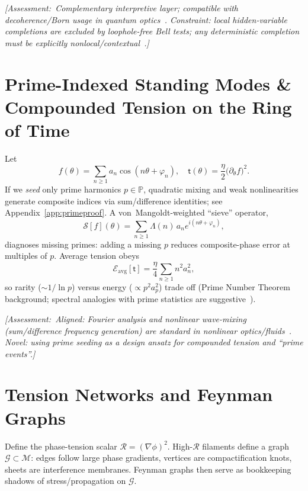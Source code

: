 \documentclass[reprint,amsmath,amssymb,aps,pra]{revtex4-2} %
\newcommand{\Primes}{\mathbb{P}}              %
\newcommand{\M}{\mathcal{M}}                   %
\newcommand{\R}{\mathcal{R}}                   %
\newcommand{\Eavg}{\mathcal{E}_{\!\mathrm{avg}}}
\newcommand{\taufield}{\mathsf{t}}             %
\newcommand{\Assessment}[1]{\par\smallskip\noindent\textit{\color{blue}[Assessment:\ #1]}\par\smallskip}
\begin{document}
\Assessment{Complementary interpretive layer; compatible with decoherence/Born usage in quantum optics~\cite{MandelWolf1995}. Constraint: local hidden-variable completions are excluded by loophole-free Bell tests; any deterministic completion must be explicitly nonlocal/contextual~\cite{Hensen2015,Giustina2015,Shalm2015,Bohm1952}.}

\section{Prime-Indexed Standing Modes \& Compounded Tension on the Ring of Time}
Let
  \begin{equation}
    f(\theta)=\sum_{n\ge1} a_n \cos{(n\theta+\varphi_n)},\quad
    \taufield(\theta)=\frac{\eta}{2}\big(\partial_\theta f\big)^2.
  \label{eq:fourier-tension}
\end{equation}
If we \emph{seed} only prime harmonics $p\in\Primes$, quadratic mixing and weak nonlinearities generate composite indices via sum/difference identities; see Appendix~\ref{app:primeproof}. A von~Mangoldt-weighted ``sieve'' operator,
\begin{equation}
\mathcal{S}[f](\theta)=\sum_{n\ge1}\Lambda(n)\, a_n e^{i(n\theta+\varphi_n)},
  \label{eq:vonmangoldt}
\end{equation}
diagnoses missing primes: adding a missing $p$ reduces composite-phase error at multiples of $p$. Average tension obeys
\begin{equation}
\Eavg[\taufield]=\frac{\eta}{4}\sum_{n\ge1} n^2 a_n^2,
  \label{eq:avg-tension}
\end{equation}
so rarity ($\sim 1/\ln p$) versus energy ($\propto p^2 a_p^2$) trade off (Prime Number Theorem background; spectral analogies with prime statistics are suggestive~\cite{Montgomery1973,BerryKeating1999}).

\Assessment{Aligned: Fourier analysis and nonlinear wave-mixing (sum/difference frequency generation) are standard in nonlinear optics/fluids~\cite{BoydNLO}. Novel: using prime seeding as a \emph{design ansatz} for compounded tension and ``prime events''.}

\section{Tension Networks and Feynman Graphs}
Define the phase-tension scalar $\R = (\nabla \phi)^2$. High-$\R$ filaments define a graph $\mathcal{G}\subset\M$: edges follow large phase gradients, vertices are compactification knots, sheets are interference membranes. Feynman graphs then serve as bookkeeping shadows of stress/propagation on $\mathcal{G}$.
\end{document}
